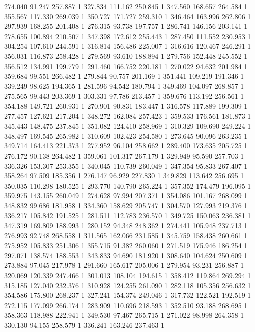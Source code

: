 	274.040	91.247	257.887	1
	327.834	111.162	250.845	1
	347.560	168.657	264.584	1
	355.567	117.330	269.039	1
	350.727	171.727	259.310	1
	346.464	163.996	262.806	1
	297.939	168.255	201.408	1
	276.315	93.738	197.757	1
	286.741	146.156	203.141	1
	278.655	100.894	210.507	1
	347.398	172.612	255.443	1
	287.450	111.552	230.953	1
	304.254	107.610	244.591	1
	316.814	156.486	225.007	1
	316.616	120.467	246.291	1
	356.031	116.873	258.428	1
	279.569	93.610	188.894	1
	279.756	152.448	245.552	1
	356.512	134.991	199.779	1
	291.460	166.752	220.181	1
	270.022	94.632	201.984	1
	359.684	99.551	266.482	1
	279.844	90.757	201.169	1
	351.441	109.219	191.346	1
	339.249	98.625	194.365	1
	281.596	94.542	180.794	1
	349.469	104.097	268.857	1
	275.565	99.443	203.369	1
	303.331	97.786	213.457	1
	359.676	113.192	256.561	1
	354.188	149.721	260.931	1
	270.901	90.831	183.447	1
	316.578	117.889	199.309	1
	277.457	127.621	217.204	1
	348.272	162.084	257.423	1
	359.533	176.561	181.873	1
	345.443	148.475	237.845	1
	351.082	124.410	258.969	1
	310.329	109.690	249.224	1
	348.497	169.545	265.982	1
	310.609	102.423	254.580	1
	273.645	90.096	263.235	1
	349.714	164.413	221.373	1
	277.952	96.104	258.662	1
	289.400	173.635	205.725	1
	276.172	90.138	264.482	1
	359.061	101.317	267.179	1
	329.949	95.590	257.703	1
	336.326	153.307	253.355	1
	340.045	110.739	260.049	1
	347.354	95.833	267.407	1
	358.264	97.509	185.356	1
	276.147	96.929	227.830	1
	349.829	113.642	256.695	1
	350.035	110.298	180.525	1
	293.770	140.790	265.224	1
	357.352	174.479	196.095	1
	359.975	143.155	260.049	1
	274.628	97.994	207.371	1
	354.086	101.167	268.099	1
	348.832	99.686	181.958	1
	334.360	158.629	205.747	1
	304.570	127.993	219.376	1
	336.217	105.842	191.525	1
	281.511	112.783	236.570	1
	349.725	150.063	236.381	1
	347.319	169.809	188.993	1
	280.152	94.348	248.362	1
	274.441	105.948	237.713	1
	276.993	92.748	268.558	1
	311.565	162.066	231.585	1
	345.759	158.438	260.661	1
	275.952	105.833	251.306	1
	355.715	91.382	260.060	1
	271.519	175.946	186.254	1
	297.071	138.574	188.553	1
	343.833	94.690	181.920	1
	308.640	104.624	250.609	1
	273.884	97.045	217.978	1
	291.660	165.617	205.006	1
	279.954	93.231	256.887	1
	320.069	120.339	247.466	1
	301.013	108.104	194.615	1
	358.412	119.864	269.294	1
	315.185	127.040	232.376	1
	310.928	124.255	261.090	1
	282.118	105.356	256.632	1
	354.586	175.800	268.237	1
	327.241	154.374	249.046	1
	317.732	122.521	192.519	1
	272.115	177.099	266.174	1
	283.909	110.696	218.593	1
	352.510	93.188	268.695	1
	358.363	118.988	222.941	1
	349.530	97.467	265.715	1
	271.022	98.998	264.358	1
	330.130	94.155	258.579	1
	336.241	163.246	237.463	1
